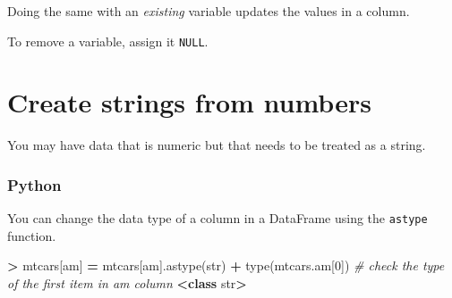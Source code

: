 \documentclass[
]{book}
\newenvironment{Shaded}{\begin{snugshade}}{\end{snugshade}}
\newcommand{\BuiltInTok}[1]{#1}
\newcommand{\CommentTok}[1]{\textcolor[rgb]{0.56,0.35,0.01}{\textit{#1}}}
\newcommand{\ConstantTok}[1]{\textcolor[rgb]{0.00,0.00,0.00}{#1}}
\newcommand{\DecValTok}[1]{\textcolor[rgb]{0.00,0.00,0.81}{#1}}
\newcommand{\ErrorTok}[1]{\textcolor[rgb]{0.64,0.00,0.00}{\textbf{#1}}}
\newcommand{\KeywordTok}[1]{\textcolor[rgb]{0.13,0.29,0.53}{\textbf{#1}}}
\newcommand{\NormalTok}[1]{#1}
\newcommand{\OperatorTok}[1]{\textcolor[rgb]{0.81,0.36,0.00}{\textbf{#1}}}
\newcommand{\OtherTok}[1]{\textcolor[rgb]{0.56,0.35,0.01}{#1}}
\newcommand{\SpecialCharTok}[1]{\textcolor[rgb]{0.00,0.00,0.00}{#1}}
\newcommand{\StringTok}[1]{\textcolor[rgb]{0.31,0.60,0.02}{#1}}
\begin{document}
Doing the same with an \emph{existing} variable updates the values in a column.

\begin{Shaded}
\end{Shaded}

To remove a variable, assign it \texttt{NULL}.

\begin{Shaded}
\end{Shaded}

\hypertarget{create-strings-from-numbers}{%
\section{Create strings from numbers}\label{create-strings-from-numbers}}

You may have data that is numeric but that needs to be treated as a string.

\hypertarget{python-18}{%
\subsubsection*{Python}\label{python-18}}

You can change the data type of a column in a DataFrame using the \texttt{astype} function.

\begin{Shaded}
\begin{Highlighting}[]
\OperatorTok{\textgreater{}}\NormalTok{ mtcars[}\StringTok{\textquotesingle{}am\textquotesingle{}}\NormalTok{] }\OperatorTok{=}\NormalTok{ mtcars[}\StringTok{\textquotesingle{}am\textquotesingle{}}\NormalTok{].astype(}\BuiltInTok{str}\NormalTok{)}
\OperatorTok{+} \BuiltInTok{type}\NormalTok{(mtcars.am[}\DecValTok{0}\NormalTok{]) }\CommentTok{\# check the type of the first item in \textquotesingle{}am\textquotesingle{} column}
\OperatorTok{\textless{}}\KeywordTok{class} \StringTok{\textquotesingle{}str\textquotesingle{}}\OperatorTok{\textgreater{}}
\end{Highlighting}
\end{Shaded}
\end{document}

